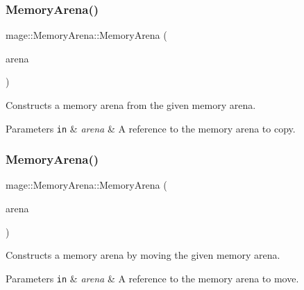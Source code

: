 \subsubsection{\texorpdfstring{Memory\+Arena()}{MemoryArena()}\hspace{0.1cm}{\footnotesize\ttfamily [2/3]}}
{\footnotesize\ttfamily mage\+::\+Memory\+Arena\+::\+Memory\+Arena (\begin{DoxyParamCaption}\item[{const \hyperlink{classmage_1_1_memory_arena}{Memory\+Arena} \&}]{arena }\end{DoxyParamCaption})\hspace{0.3cm}{\ttfamily [delete]}}

Constructs a memory arena from the given memory arena.


\begin{DoxyParams}[1]{Parameters}
\mbox{\tt in}  & {\em arena} & A reference to the memory arena to copy. \\
\hline
\end{DoxyParams}
\hypertarget{classmage_1_1_memory_arena_a98829c5a87ba028c376f100cca09e876}{}\label{classmage_1_1_memory_arena_a98829c5a87ba028c376f100cca09e876} 
\subsubsection{\texorpdfstring{Memory\+Arena()}{MemoryArena()}\hspace{0.1cm}{\footnotesize\ttfamily [3/3]}}
{\footnotesize\ttfamily mage\+::\+Memory\+Arena\+::\+Memory\+Arena (\begin{DoxyParamCaption}\item[{\hyperlink{classmage_1_1_memory_arena}{Memory\+Arena} \&\&}]{arena }\end{DoxyParamCaption})\hspace{0.3cm}{\ttfamily [default]}}

Constructs a memory arena by moving the given memory arena.


\begin{DoxyParams}[1]{Parameters}
\mbox{\tt in}  & {\em arena} & A reference to the memory arena to move. \\
\hline
\end{DoxyParams}
\hypertarget{classmage_1_1_memory_arena_acfee6fc205e2eaf6aeef4acf19948e6e}{}\label{classmage_1_1_memory_arena_acfee6fc205e2eaf6aeef4acf19948e6e} 
